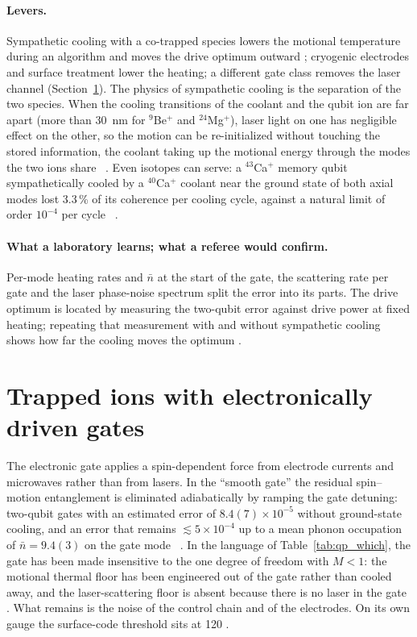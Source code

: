 \paragraph{Levers.} Sympathetic cooling with a co-trapped species lowers the motional temperature during an algorithm and moves the drive
optimum outward \interp; cryogenic electrodes and surface treatment lower the heating; a different gate class removes the laser channel
(Section~\ref{sec:qp_ionelec}). The physics of sympathetic cooling is the separation of the two species. When the cooling transitions of the coolant and the qubit
ion are far apart (more than 30~nm for $^{9}$Be$^+$ and $^{24}$Mg$^+$), laser light on one has negligible effect on the other, so the
motion can be re-initialized without touching the stored information, the coolant taking up the motional energy through
the modes the two ions share~\cite{Barrett2003} \observed. Even isotopes can serve: a $^{43}$Ca$^+$ memory qubit sympathetically cooled by a
$^{40}$Ca$^+$ coolant near the ground state of both axial modes lost 3.3\,\% of its coherence per cooling cycle, against a natural limit
of order $10^{-4}$ per cycle~\cite{Home2009} \observed.

\paragraph{What a laboratory learns; what a referee would confirm.} Per-mode heating rates and $\bar n$ at the start of the gate, the
scattering rate per gate and the laser phase-noise spectrum split the error into its parts. The drive optimum is located by measuring the
two-qubit error against drive power at fixed heating; repeating that measurement with and without sympathetic cooling shows how far the
cooling moves the optimum \interp.

\section{Trapped ions with electronically driven gates}\label{sec:qp_ionelec}
The electronic gate applies a spin-dependent force from electrode currents and microwaves rather than from lasers. In the ``smooth gate''
the residual spin--motion entanglement is eliminated adiabatically by ramping the gate detuning: two-qubit gates with an estimated error
of $8.4(7)\times10^{-5}$ without ground-state cooling, and an error that remains $\lesssim5\times10^{-4}$ up to a mean phonon occupation of
$\bar n=9.4(3)$ on the gate mode~\cite{Hughes2025} \observed. In the language of Table~\ref{tab:qp_which}, the gate has been made
insensitive to the one degree of freedom with $M<1$: the motional thermal floor has been engineered out of the gate rather than cooled away,
and the laser-scattering floor is absent because there is no laser in the gate \interp. What remains is the noise of the control chain and
of the electrodes. On its own gauge the surface-code threshold sits at 120 \calc.

